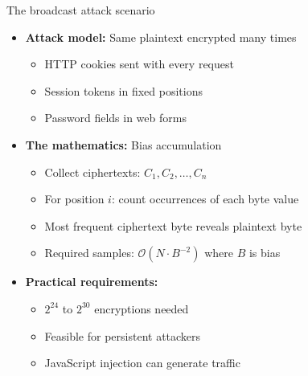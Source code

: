 \documentclass[aspectratio=169, lualatex, handout]{beamer}
\begin{document}
\begin{frame}{The broadcast attack scenario}
	\begin{itemize}[<+->]
		\item \textbf{Attack model:} Same plaintext encrypted many times
		      \begin{itemize}[<+->]
			      \item HTTP cookies sent with every request
			      \item Session tokens in fixed positions
			      \item Password fields in web forms
		      \end{itemize}
		\item \textbf{The mathematics:} Bias accumulation
		      \begin{itemize}[<+->]
			      \item Collect ciphertexts: $C_1, C_2, \ldots, C_n$
			      \item For position $i$: count occurrences of each byte value
			      \item Most frequent ciphertext byte reveals plaintext byte
			      \item Required samples: $\mathcal{O}(N \cdot B^{-2})$ where $B$ is bias
		      \end{itemize}
		\item \textbf{Practical requirements:}
		      \begin{itemize}[<+->]
			      \item $2^{24}$ to $2^{30}$ encryptions needed
			      \item Feasible for persistent attackers
			      \item JavaScript injection can generate traffic
		      \end{itemize}
	\end{itemize}
\end{frame}
\end{document}
